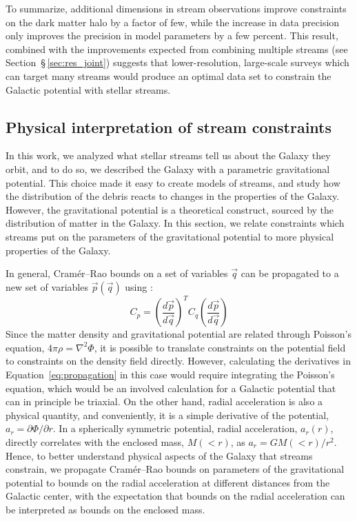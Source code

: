 \documentclass[modern]{aastex62}
\begin{document}
To summarize, additional dimensions in stream observations improve constraints on the dark matter halo by a factor of few, while the increase in data precision only improves the precision in model parameters by a few percent.
This result, combined with the improvements expected from combining multiple streams (see Section~\S\,\ref{sec:res_joint}) suggests that lower-resolution, large-scale surveys which can target many streams would produce an optimal data set to constrain the Galactic potential with stellar streams.

\subsection{Physical interpretation of stream constraints}
\label{sec:interpretation}
In this work, we analyzed what stellar streams tell us about the Galaxy they orbit, and to do so, we described the Galaxy with a parametric gravitational potential.
This choice made it easy to create models of streams, and study how the distribution of the debris reacts to changes in the properties of the Galaxy.
However, the gravitational potential is a theoretical construct, sourced by the distribution of matter in the Galaxy.
In this section, we relate constraints which streams put on the parameters of the gravitational potential to more physical properties of the Galaxy.

In general, Cram\'er--Rao bounds on a set of variables $\vec{q}$ can be propagated to a new set of variables $\vec{p}(\vec{q})$ using \citep{albrecht2009}:
\begin{equation}
C_p = \left(\frac{d\vec{p}}{d\vec{q}}\right)^{T} C_q \left(\frac{d\vec{p}}{d\vec{q}}\right)
\label{eq:propagation}
\end{equation}
Since the matter density and gravitational potential are related through Poisson's equation, $4\pi\rho = \nabla^2\Phi$, it is possible to translate constraints on the potential field to constraints on the density field directly.
However, calculating the derivatives in Equation~\ref{eq:propagation} in this case would require integrating the Poisson's equation, which would be an involved calculation for a Galactic potential that can in principle be triaxial.
On the other hand, radial acceleration is also a physical quantity, and conveniently, it is a simple derivative of the potential, $a_r = \partial\Phi / \partial r$.
In a spherically symmetric potential, radial acceleration, $a_r(r)$, directly correlates with the enclosed mass, $M(<r)$, as $a_r = G M(<r)/r^2$.
Hence, to better understand physical aspects of the Galaxy that streams constrain, we propagate Cram\'er--Rao bounds on parameters of the gravitational potential to bounds on the radial acceleration at different distances from the Galactic center, with the expectation that bounds on the radial acceleration can be interpreted as bounds on the enclosed mass.
\end{document}
